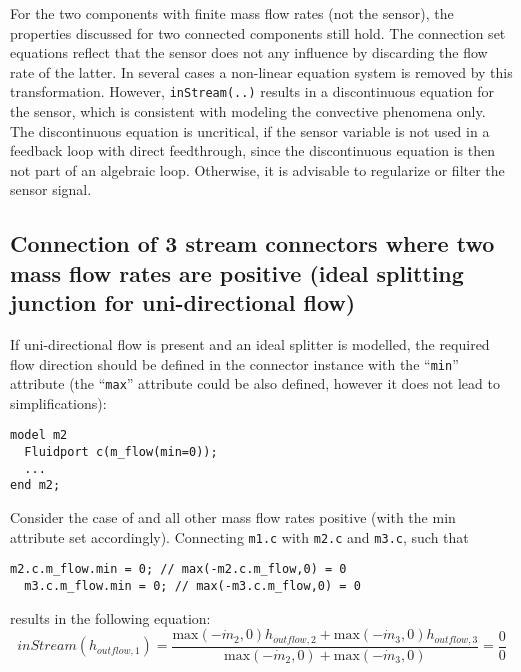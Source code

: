 For the two components with finite mass flow rates (not the sensor), the
properties discussed for two connected components still hold. The
connection set equations reflect that the sensor does not any influence
by discarding the flow rate of the latter. In several cases a non-linear
equation system is removed by this transformation. However, \lstinline!inStream(..)!
results in a discontinuous equation for the sensor, which is consistent
with modeling the convective phenomena only. The discontinuous equation
is uncritical, if the sensor variable is not used in a feedback loop
with direct feedthrough, since the discontinuous equation is then not
part of an algebraic loop. Otherwise, it is advisable to regularize or
filter the sensor signal.

\subsection{Connection of 3 stream connectors where two mass flow rates are positive (ideal splitting junction for uni-directional flow)}

If uni-directional flow is present and an ideal splitter is modelled,
the required flow direction should be defined in the connector instance
with the ``\lstinline!min!'' attribute (the ``\lstinline!max!'' attribute could be also defined,
however it does not lead to simplifications):

\begin{lstlisting}[language=modelica]
model m2
  Fluidport c(m_flow(min=0));
  ...
end m2;
\end{lstlisting}

Consider the case of and all other mass flow rates positive (with the
min attribute set accordingly). Connecting \lstinline!m1.c! with \lstinline!m2.c! and \lstinline!m3.c!, such
that

\begin{lstlisting}[language=modelica]
  m2.c.m_flow.min = 0; // max(-m2.c.m_flow,0) = 0
  m3.c.m_flow.min = 0; // max(-m3.c.m_flow,0) = 0
\end{lstlisting}
results in the following equation:
\begin{equation*}
inStream(h_{outflow,1})=\frac{\text{max}(-\dot{m}_2,0)h_{outflow,2}+\text{max}(-\dot{m}_3,0)h_{outflow,3}}{\text{max}(-\dot{m}_2,0)+\text{max}(-\dot{m}_3,0)}=\frac{0}{0}
\end{equation*}

